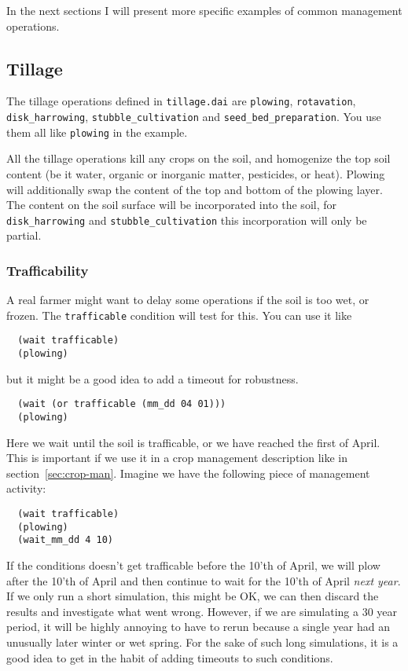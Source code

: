 \documentclass[a4paper]{article}
\begin{document}
In the next sections I will
present more specific examples of common management operations.

\subsection{Tillage}
\label{sec:tillage}

The tillage operations defined in \texttt{tillage.dai} are
\texttt{plowing}, \texttt{rotavation}, \texttt{disk\_harrowing},
\texttt{stubble\_cultivation} and \texttt{seed\_bed\_preparation}.
You use them all like \texttt{plowing} in the example.

All the tillage operations kill any crops on the soil, and homogenize
the top soil content (be it water, organic or inorganic matter,
pesticides, or heat).  Plowing will additionally swap the content of
the top and bottom of the plowing layer.  The content on the soil
surface will be incorporated into the soil, for
\texttt{disk\_harrowing} and \texttt{stubble\_cultivation} this
incorporation will only be partial.

\subsubsection{Trafficability}
\label{sec:trafficable}

A real farmer might want to delay some operations if the soil is too
wet, or frozen.  The \texttt{trafficable} condition will test for
this.  You can use it like
\begin{verbatim}
  (wait trafficable)
  (plowing)
\end{verbatim}
but it might be a good idea to add a timeout for robustness.
\begin{verbatim}
  (wait (or trafficable (mm_dd 04 01)))
  (plowing)
\end{verbatim}
Here we wait until the soil is trafficable, or we have reached the
first of April.  This is important if we use it in a crop management
description like in section~\ref{sec:crop-man}.  Imagine we have the
following piece of management activity:
\begin{verbatim}
  (wait trafficable)
  (plowing)
  (wait_mm_dd 4 10)
\end{verbatim}
If the conditions doesn't get trafficable before the 10'th of April,
we will plow after the 10'th of April and then continue to wait for
the 10'th of April \emph{next year}.  If we only run a short
simulation, this might be OK, we can then discard the results and
investigate what went wrong.  However, if we are simulating a 30 year
period, it will be highly annoying to have to rerun because a single
year had an unusually later winter or wet spring.  For the sake of
such long simulations, it is a good idea to get in the habit of
adding timeouts to such conditions.
\end{document}

